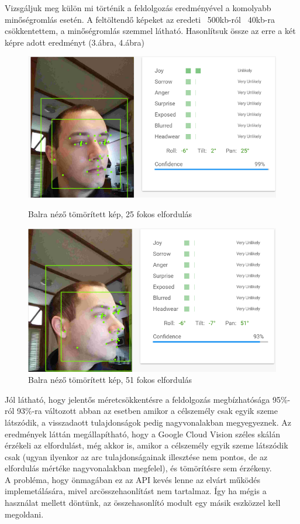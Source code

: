 Vizsgáljuk meg külön mi történik a feldolgozás eredményével a komolyabb minőségromlás esetén. A feltöltendő képeket az eredeti ~500kb-ról ~40kb-ra csökkentettem, a minőségromlás szemmel látható. Hasonlítsuk össze az erre a két képre adott eredményt (3.ábra, 4.ábra)
\begin{figure}[h]
 \begin{minipage}{.5\textwidth} 
\centering
    \includegraphics[scale=0.3]{img/cloud_vision_left_compressed}
    \caption{Balra néző tömörített kép, 25 fokos elfordulás}
 \end{minipage}
 \begin{minipage}{.5\textwidth} 
\centering
     \includegraphics[scale=0.3]{img/cloud_vision_very_left_compressed}
     \caption{Balra néző tömörített kép, 51 fokos elfordulás}
 \end{minipage}
\end{figure}

Jól látható, hogy jelentős méretcsökkentésre a feldolgozás megbízhatósága 95\%-ról 93\%-ra változott abban az esetben amikor a célszemély csak egyik szeme látszódik, a visszadaott tulajdonságok pedig nagyvonalakban megyegyeznek. 
Az eredmények láttán megállapítható, hogy a Google Cloud Vision széles skálán érzékeli az elfordulást, még akkor is, amikor a célszemély egyik szeme látszódik csak (ugyan ilyenkor az arc tulajdonságainak illesztése nem pontos, de az elfordulás mértéke nagyvonalakban megfelel), és tömörítésre sem érzékeny.
\\A probléma, hogy önmagában ez az API kevés lenne az elvárt működés implemetálására, mivel arcösszehaonlítást nem tartalmaz. Így ha mégis a használat mellett döntünk, az összehasonlító modult egy másik eszközzel kell megoldani.

